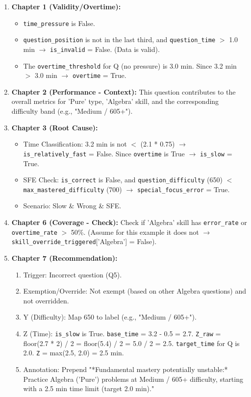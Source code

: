 \documentclass{article}
\begin{document}
\begin{enumerate}
    \item \textbf{Chapter 1 (Validity/Overtime):}
        \begin{itemize}
            \item \texttt{time\_pressure} is False.
            \item \texttt{question\_position} is not in the last third, and \texttt{question\_time} $>$ 1.0 min $\rightarrow$ \texttt{is\_invalid} = False. (Data is valid). %
            \item The \texttt{overtime\_threshold} for Q (no pressure) is 3.0 min. Since 3.2 min $>$ 3.0 min $\rightarrow$ \texttt{overtime} = True. %
        \end{itemize}
    \item \textbf{Chapter 2 (Performance - Context):} This question contributes to the overall metrics for 'Pure' type, 'Algebra' skill, and the corresponding difficulty band (e.g., "Medium / 605+").
    \item \textbf{Chapter 3 (Root Cause):}
        \begin{itemize}
            \item Time Classification: 3.2 min is not $<$ (2.1 * 0.75) $\rightarrow$ \texttt{is\_relatively\_fast} = False. Since \texttt{overtime} is True $\rightarrow$ \texttt{is\_slow} = True. %
            \item SFE Check: \texttt{is\_correct} is False, and \texttt{question\_difficulty} (650) $<$ \texttt{max\_mastered\_difficulty} (700) $\rightarrow$ \texttt{special\_focus\_error} = True. %
            \item Scenario: Slow \& Wrong \& SFE.
        \end{itemize}
    \item \textbf{Chapter 6 (Coverage - Check):} Check if 'Algebra' skill has \texttt{error\_rate} or \texttt{overtime\_rate} $>$ 50\%. (Assume for this example it does not $\rightarrow$ \texttt{skill\_override\_triggered}['Algebra'] = False). %
    \item \textbf{Chapter 7 (Recommendation):}
        \begin{enumerate}
            \item Trigger: Incorrect question (Q5).
            \item Exemption/Override: Not exempt (based on other Algebra questions) and not overridden.
            \item Y (Difficulty): Map 650 to label (e.g., "Medium / 605+").
            \item Z (Time): \texttt{is\_slow} is True. \texttt{base\_time} = 3.2 - 0.5 = 2.7. \texttt{Z\_raw} = floor(2.7 * 2) / 2 = floor(5.4) / 2 = 5.0 / 2 = 2.5. \texttt{target\_time} for Q is 2.0. \texttt{Z} = max(2.5, 2.0) = 2.5 min.
            \item Annotation: Prepend "*Fundamental mastery potentially unstable:* Practice Algebra ('Pure') problems at Medium / 605+ difficulty, starting with a 2.5 min time limit (target 2.0 min)."
        \end{enumerate}
\end{enumerate}
\end{document}
